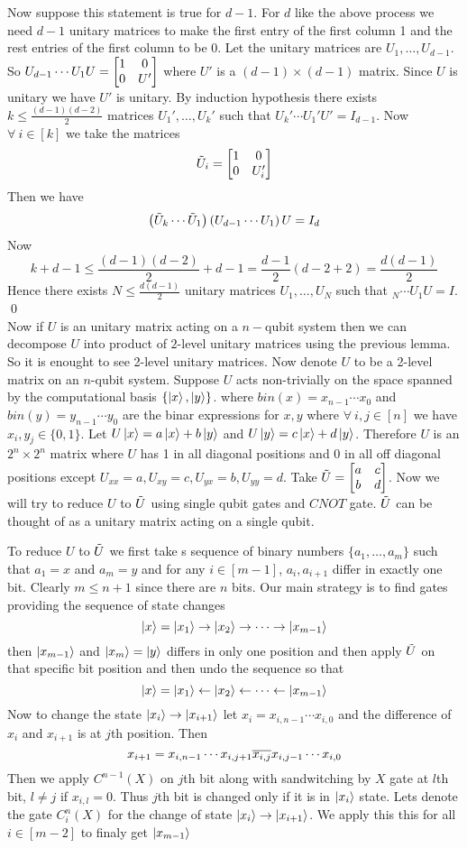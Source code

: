 \documentclass[a4paper, 11pt]{article}
\renewenvironment{proof}{\noindent{\it \textbf{Proof:}}\hspace*{1em}}{\qed\bigskip\\}
\begin{document}
{\begin{proof}
		Now suppose this statement is true for $d-1$. For $d$ like the above process we need $d-1$ unitary matrices to make the first entry of the first column 1 and the rest entries of the first column to be 0. Let the unitary matrices are $U_1,\dots, U_{d-1}$. So $U_{d-1}\cdots U_1U=\left[\begin{matrix}1 & 0 \\ 0 & U'\end{matrix}\right]$ where $U'$ is a $(d-1)\times (d-1)$ matrix. Since $U$ is unitary we have $U'$ is unitary. By induction hypothesis there exists $k\leq \frac{(d-1)(d-2)}2$ matrices $U_1',\dots, U_k'$ such that $U_k'\cdots U_1'U'=I_{d-1}$. Now $\forall \ i\in [k]$ we take the matrices $$\tilde{U}_i=\left[\begin{matrix}1& 0\\ 0 & U_i'\end{matrix}\right]$$Then we have $$\left( \tilde{U}_k\cdots \tilde{U}_1\right)\left( U_{d-1}\cdots U_1\right)U=I_{d}$$ Now $$k+d-1\leq \frac{(d-1)(d-2)}2+d-1=\frac{d-1}2(d-2+2)=\frac{d(d-1)}2$$Hence there exists $N\leq \frac{d(d-1)}2$ unitary matrices $U_1,\dots , U_N$ such that $_N\cdots U_1U=I$.
	\end{proof}
	Now if $U$ is an unitary matrix acting on a $n-$qubit system then we can decompose $U$ into product of $2$-level unitary matrices using the previous lemma. So it is enought to see 2-level unitary matrices. Now denote $U$ to be a 2-level matrix on an $n$-qubit system. Suppose $U$ acts non-trivially on the space spanned by the computational basis $\{\ket{x},\ket{y}\}$. where $bin(x)=x_{n-1}\cdots x_0$ and $bin(y)=y_{n-1}\cdots y_0$ are the binar expressions for $x,y$ where $\forall\ i,j\in [n]$ we have $x_i, y_j\in \{0,1\}$. Let $U\ket{x}=a\ket{x}+b\ket{y}$ and $U\ket{y}=c\ket{x}+d\ket{y}$. Therefore $U$ is an $2^n\times 2^n$ matrix where $U$ has 1 in all diagonal positions and 0 in all off diagonal positions except $U_{xx}=a, U_{xy}=c, U_{yx}=b, U_{yy}=d$. Take $\tilde{U}=\left[\begin{matrix}a & c\\ b & d\end{matrix}\right]$. Now we will try to reduce $U$ to $\tilde{U}$ using single qubit gates and $CNOT$ gate. $\tilde{U}$ can be thought of as a unitary matrix acting on a single qubit. 
	
	To reduce $U$ to $\tilde{U}$ we first take s sequence of binary numbers $\{ a_1,\dots , a_m\}$ such that $a_1=x$ and $a_m=y$ and for any $i\in [m-1]$, $a_i, a_{i+1}$ differ in exactly one bit. Clearly $m\leq n+1$ since there are $n$ bits. Our main strategy is to find gates providing the sequence of state changes $$\ket{x}=\ket{x_1}\to \ket{x_2}\to \cdots \to \ket{x_{m-1}}$$ then $\ket{x_{m-1}}$ and $\ket{x_m}=\ket{y}$ differs in only one position and then apply $\tilde{U}$ on that specific bit position and then undo the sequence so that $$\ket{x}=\ket{x_1}\leftarrow \ket{x_2}\leftarrow \cdots \leftarrow \ket{x_{m-1}}$$ Now to change the state $\ket{x_i}\to \ket{x_{i+1}}$ let $x_i=x_{i,n-1}\cdots x_{i,0}$ and the difference of $x_i$ and $x_{i+1}$ is at $j$th position. Then $$x_{i+1}=x_{i,n-1}\cdots x_{i,j+1}\overline{x_{i,j}}x_{i,j-1}\cdots x_{i,0}$$ Then we apply $C^{n-1}(X)$ on $j$th bit along  with sandwitching by $X$ gate at $l$th bit, $l\neq j$ if $x_{i,l}=0$. Thus $j$th bit is changed only if it is in  $\ket{x_i}$ state. Lets denote the gate $C_i^n(X)$ for the change of state   $\ket{x_i}\to \ket{x_{i+1}}$. We apply this this for all $i\in [m-2]$ to finaly get $\ket{x_{m-1}}$
	
}
\end{document}
